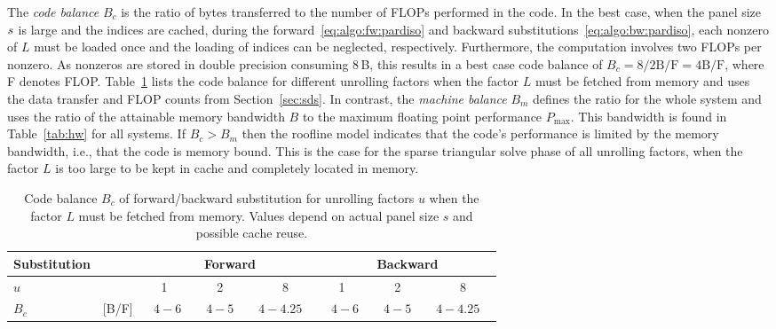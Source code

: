 The \textit{code balance} $B_c$ is the ratio of bytes transferred to the
number of FLOPs performed in the code.
In the best case, when the panel size $s$ is large and the indices are
cached, during the forward~\eqref{eq:algo:fw:pardiso} and backward
substitutions~\eqref{eq:algo:bw:pardiso}, each nonzero of $L$ must be loaded once
and the loading of indices can be neglected,
respectively. 
Furthermore, the computation involves two FLOPs per nonzero.
As nonzeros are stored in double precision consuming $8$\,B, this results in a
best case code balance of $B_c = 8 / 2 \text{B/F} = 4 \text{B/F}$, where F
denotes FLOP.
Table~\ref{tab:mrm:bc} lists the code balance for different unrolling factors
when the factor $L$ must be fetched from memory and uses the data transfer and
FLOP counts from Section~\ref{sec:sds}.
In contrast, the \textit{machine balance} $B_m$ defines the ratio for the whole system
and uses the ratio of the attainable memory bandwidth $B$ to the maximum floating point
performance $P_\text{max}$.
This bandwidth is found in Table~\ref{tab:hw} for all systems.
%
If $B_c > B_m$ then the roofline model indicates 
that the code's performance is
limited by the memory bandwidth,
i.e., that the code is memory bound.
{This is the case for the sparse %
triangular solve 
phase %
of all
unrolling factors,
when the factor $L$ is too large to be kept in cache and
completely located in memory.}

\begin{table}[t]
  \centering
   \begin{tabular}{ll|cm{}cm{}c|cm{}cm{}c}
  \hline
  Substitution && \multicolumn{5}{c|}{Forward} & \multicolumn{5}{c}{Backward} \\
  \hline
     $u$    &     &  1   &  & 2    &  & 8        & 1     &  & 2   &  & 8  \\
     $B_c$  & [B/F]\, & \ $4-6$ & & $4-5$ & & $4-4.25$ \ & \ $4-6$ & & $4-5$ & & $4-4.25$ \ \\
  \hline
  \end{tabular}
  \caption{Code balance $B_c$ of forward/backward substitution for
unrolling factors $u$ when
the factor $L$ must be fetched from memory.
Values depend on actual panel size $s$ and possible cache reuse.}
  \label{tab:mrm:bc}
\end{table}

